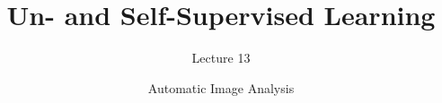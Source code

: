 \documentclass[aspectratio=169,xcolor=dvipsnames]{beamer}
\title[short title]{Un- and Self-Supervised Learning}
\subtitle{Lecture 13}
\author{Automatic Image Analysis}
\begin{document}
\begin{frame}
    \titlepage
\end{frame}





\end{document}
